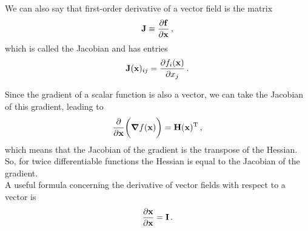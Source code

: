         We can also say that first-order derivative of a vector field is the matrix
        \begin{equation}
            \vb{J} \equiv \pdv{\vb{f}}{\vb{x}} \thinspace ,
        \end{equation}
        which is called the Jacobian and has entries
        \begin{equation} \label{eq:jacobian}
            \vb{J}(\vb{x})_{ij} = \pdv{f_i(\vb{x})}{x_j} \thinspace .
        \end{equation}

        Since the gradient of a scalar function is also a vector, we can take the Jacobian of this gradient, leading to
        \begin{equation}
            \pdv{\vb{x}} \bigg( \grad{f(\vb{x})} \bigg) = \vb{H}(\vb{x})^\text{T} \thinspace ,
        \end{equation}
        which means that the Jacobian of the gradient is the transpose of the Hessian. So, for twice differentiable functions the Hessian is equal to the Jacobian of the gradient. \\

        A useful formula concerning the derivative of vector fields with respect to a vector is
        \begin{align}
            \pdv{\vb{x}}{\vb{x}} = \vb{I} \thinspace .
        \end{align}
